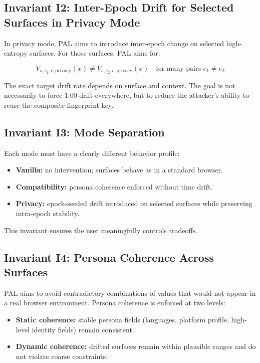 \documentclass[11pt]{report}
\begin{document}
\subsection{Invariant I2: Inter-Epoch Drift for Selected Surfaces in Privacy Mode}

In privacy mode, PAL aims to introduce inter-epoch change on selected high-entropy surfaces. For those surfaces, PAL aims for:

\[
V_{s,e_1,c,\text{privacy}}(x) \ne V_{s,e_2,c,\text{privacy}}(x)
\quad \text{for many pairs } e_1 \ne e_2
\]

The exact target drift rate depends on surface and context. The goal is not necessarily to force 1.00 drift everywhere, but to reduce the attacker’s ability to reuse the composite fingerprint key.

\subsection{Invariant I3: Mode Separation}

Each mode must have a clearly different behavior profile:

\begin{itemize}
    \item \textbf{Vanilla:} no intervention; surfaces behave as in a standard browser.
    \item \textbf{Compatibility:} persona coherence enforced without time drift.
    \item \textbf{Privacy:} epoch-seeded drift introduced on selected surfaces while preserving intra-epoch stability.
\end{itemize}

This invariant ensures the user meaningfully controls tradeoffs.

\subsection{Invariant I4: Persona Coherence Across Surfaces}

PAL aims to avoid contradictory combinations of values that would not appear in a real browser environment. Persona coherence is enforced at two levels:

\begin{itemize}
    \item \textbf{Static coherence:} stable persona fields (languages, platform profile, high-level identity fields) remain consistent.
    \item \textbf{Dynamic coherence:} drifted surfaces remain within plausible ranges and do not violate coarse constraints.
\end{itemize}
\end{document}
